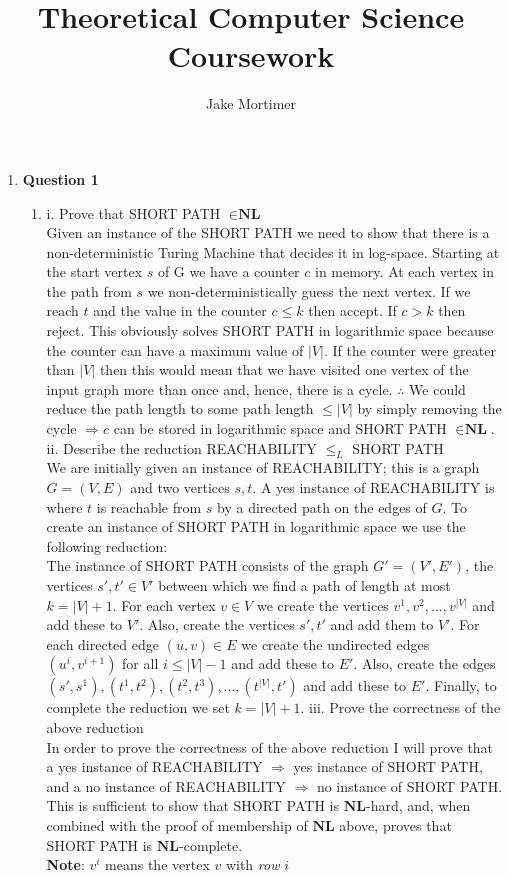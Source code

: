 \documentclass[12pt]{article}
\begin{document}
\title{\vspace{-5cm} Theoretical Computer Science Coursework}
\author{Jake Mortimer}
\maketitle
\begin{enumerate}
\section{Complexity and Approximability} 
\item \textbf{Question 1}
\begin{enumerate}
\item 
i. Prove that SHORT PATH $\in \textbf{NL}$ \\
Given an instance of the SHORT PATH we need to show that there is a non-deterministic Turing Machine that decides it in log-space. Starting at the start vertex $s$ of G we have a counter $c$ in memory. At each vertex in the path from $s$ we non-deterministically guess the next vertex. If we reach $t$ and the value in the counter $c \leq k$ then accept. If $c>k$ then reject. This obviously solves SHORT PATH in logarithmic space because the counter can have a maximum value of $|V|$. If the counter were greater than $|V|$ then this would mean that we have visited one vertex of the input graph more than once and, hence, there is a cycle. $\therefore $ We could reduce the path length to some path length $\leq |V|$ by simply removing the cycle $\Rightarrow c$ can be stored in logarithmic space and SHORT PATH $\in \textbf{NL}$.\\
ii. Describe the reduction REACHABILITY $\leq _{L} $ SHORT PATH \\
We are initially given an instance of REACHABILITY; this is a graph $G = (V,E)$ and two vertices $s,t$. A yes instance of REACHABILITY is where $t$ is reachable from $s$ by a directed path on the edges of $G$. To create an instance of SHORT PATH in logarithmic space we use the following reduction:\\
The instance of SHORT PATH consists of the graph $G'=(V',E')$, the vertices $s',t' \in V'$ between which we find a path of length at most $k=|V|+1$. For each vertex $v \in V$ we create the vertices $v^1,v^2,...,v^{|V|}$ and add these to $V'$. Also, create the vertices $s',t'$ and add them to $V'$. For each directed edge $(u,v) \in E$ we create the undirected edges $(u^i,v^{i+1})$ for all $i \leq |V|-1$ and add these to $E'$. Also, create the edges $(s',s^1),(t^1,t^2),(t^2,t^3),...,(t^{|V|},t')$ and add these to $E'$. Finally, to complete the reduction we set $k=|V|+1$.
iii. Prove the correctness of the above reduction\\
In order to prove the correctness of the above reduction I will prove that a yes instance of REACHABILITY $\Rightarrow $ yes instance of SHORT PATH, and a no instance of REACHABILITY $\Rightarrow $ no instance of SHORT PATH. This is sufficient to show that SHORT PATH is $\textbf{NL}$-hard, and, when combined with the proof of membership of $\textbf{NL}$ above, proves that SHORT PATH is $\textbf{NL}$-complete.\\
\textbf{Note}: $v^i$ means the vertex $v$ with \textit{row} $i$


\end{enumerate}
\end{enumerate}
\end{document}
